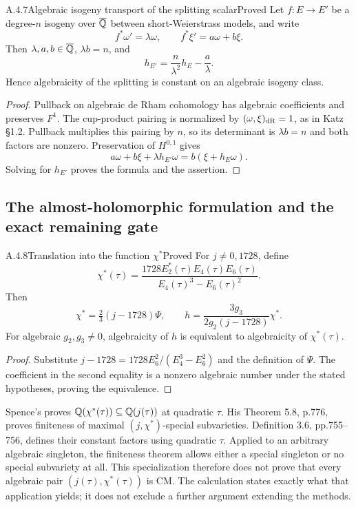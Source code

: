\begin{result}{A.4.7}{Algebraic isogeny transport of the splitting scalar}{Proved}
Let $f:E\to E'$ be a degree-$n$ isogeny over $\overline{\mathbb Q}$ between short-Weierstrass models, and write
\[
 f^*\omega'=\lambda\omega,\qquad f^*\xi'=a\omega+b\xi.
\]
Then $\lambda,a,b\in\overline{\mathbb Q}$, $\lambda b=n$, and
\[
 h_{E'}=\frac{n}{\lambda^2}h_E-\frac a\lambda.
\]
Hence algebraicity of the splitting is constant on an algebraic isogeny class.
\end{result}
\begin{proof}
Pullback on algebraic de Rham cohomology has algebraic coefficients and preserves $F^1$. The cup-product pairing is normalized by $(\omega,\xi)_{\mathrm{dR}}=1$, as in Katz \S1.2. Pullback multiplies this pairing by $n$, so its determinant is $\lambda b=n$ and both factors are nonzero. Preservation of $H^{0,1}$ gives
\[
 a\omega+b\xi+\lambda h_{E'}\omega=b(\xi+h_E\omega).
\]
Solving for $h_{E'}$ proves the formula and the assertion.
\end{proof}

\subsection{The almost-holomorphic formulation and the exact remaining gate}

\begin{result}{A.4.8}{Translation into the function $\chi^*$}{Proved}
For $j\ne0,1728$, define
\[
 \chi^*(\tau)=\frac{1728E_2^*(\tau)E_4(\tau)E_6(\tau)}
 {E_4(\tau)^3-E_6(\tau)^2}.
\]
Then
\[
 \chi^*=\tfrac23(j-1728)\Psi,\qquad
 h=\frac{3g_3}{2g_2(j-1728)}\chi^*.
\]
For algebraic $g_2,g_3\ne0$, algebraicity of $h$ is equivalent to algebraicity of $\chi^*(\tau)$.
\end{result}
\begin{proof}
Substitute $j-1728=1728E_6^2/(E_4^3-E_6^2)$ and the definition of $\Psi$. The coefficient in the second equality is a nonzero algebraic number under the stated hypotheses, proving the equivalence.
\end{proof}

Spence's \cite[Proposition 5.1, p.773]{EllSpence2018} proves $\mathbb Q(\chi^*(\tau))\subseteq\mathbb Q(j(\tau))$ at quadratic $\tau$. His Theorem 5.8, p.776, proves finiteness of maximal $(j,\chi^*)$-special subvarieties. Definition 3.6, pp.755--756, defines their constant factors using quadratic $\tau$. Applied to an arbitrary algebraic singleton, the finiteness theorem allows either a special singleton or no special subvariety at all. This specialization therefore does not prove that every algebraic pair $(j(\tau),\chi^*(\tau))$ is CM. The calculation states exactly what that application yields; it does not exclude a further argument extending the methods.

